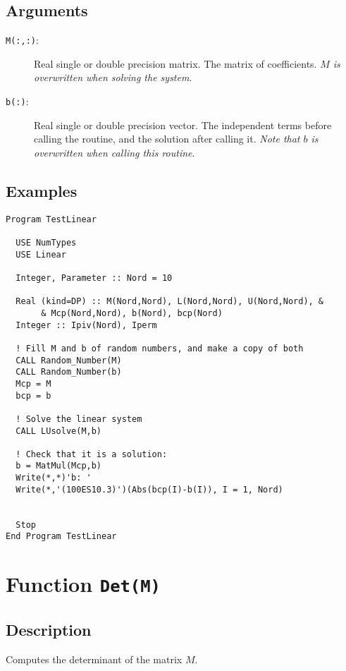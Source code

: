 \subsection{Arguments}

\begin{description}
\item[\texttt{M(:,:)}: ] Real single or double precision matrix. The matrix
  of coefficients. \emph{$M$ is overwritten when solving the system}.
\item[\texttt{b(:)}: ] Real single or double precision vector. The
  independent terms before calling the routine, and the solution after
  calling it. \emph{Note that $b$ is overwritten when calling this
    routine}. 
\end{description}

\subsection{Examples}

\begin{verbatim}
Program TestLinear

  USE NumTypes
  USE Linear

  Integer, Parameter :: Nord = 10

  Real (kind=DP) :: M(Nord,Nord), L(Nord,Nord), U(Nord,Nord), &
       & Mcp(Nord,Nord), b(Nord), bcp(Nord)
  Integer :: Ipiv(Nord), Iperm

  ! Fill M and b of random numbers, and make a copy of both
  CALL Random_Number(M)
  CALL Random_Number(b)
  Mcp = M
  bcp = b

  ! Solve the linear system
  CALL LUsolve(M,b)
  
  ! Check that it is a solution:
  b = MatMul(Mcp,b)
  Write(*,*)'b: '
  Write(*,'(100ES10.3)')(Abs(bcp(I)-b(I)), I = 1, Nord)


  Stop
End Program TestLinear
\end{verbatim}


\section{Function \texttt{Det(M)}}

\subsection{Description}

Computes the determinant of the matrix $M$.

